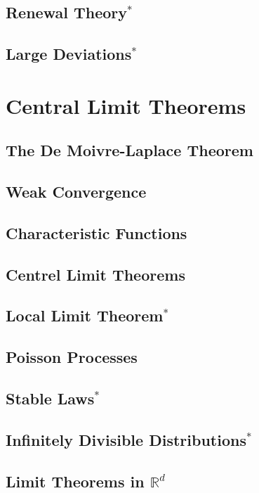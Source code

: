 \documentclass{report}
\newcommand{\R}{\mathbb R}
\begin{document}
\section{Renewal Theory$^*$}
\section{Large Deviations$^*$}

\chapter{Central Limit Theorems}
\section{The De Moivre-Laplace Theorem}
\section{Weak Convergence}
\section{Characteristic Functions}
\section{Centrel Limit Theorems}
\section{Local Limit Theorem$^*$}
\section{Poisson Processes}
\section{Stable Laws$^*$}
\section{Infinitely Divisible Distributions$^*$}
\section{Limit Theorems in $\R^d$}
\end{document}
